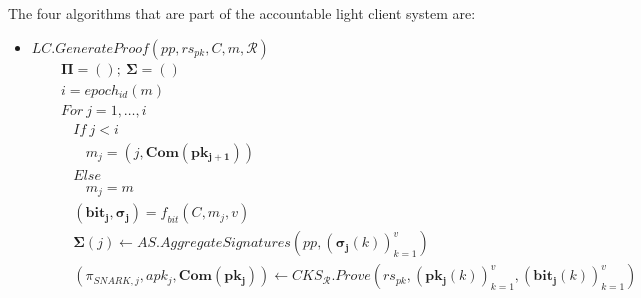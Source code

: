 \noindent The four algorithms that are part of the accountable light client system are: 
\begin{itemize}
\item $\mathit{LC.GenerateProof}(\mathit{pp}, \mathit{rs_{\mathit{pk}}}, C, m, \mathcal{R})$
\begin{align*}
&\ \ \ \ \mathbf{\Pi} = (); \ \mathbf{\Sigma} = () \\
&\ \ \ \ i = \mathit{epoch_{id}}(m) \\
&\ \ \ \ \mathit{For} \ j = 1, \ldots, i \\
&\ \ \ \ \ \ \ \ \mathit{If} \  j < i  \\
&\ \ \ \ \ \ \ \ \ \ \ \ \mathit{m_j}= (j,\mathbf{Com}(\mathbf{pk_{j+1}})) \\
&\ \ \ \ \ \ \ \ \mathit{Else} \\
&\ \ \ \ \ \ \ \ \ \ \ \ \mathit{m_j} = m  \\
&\ \ \ \ \ \ \ \ (\mathbf{bit_j}, \mathbf{\sigma_j}) = \mathit{f_{bit}}(C, m_j, v) \\
&\ \ \ \ \ \ \ \ \mathbf{\Sigma}(j) \leftarrow \mathit{AS.AggregateSignatures}(\mathit{pp}, (\mathbf{\sigma_j}(k))_{k=1}^v) \\ 
&\ \ \ \ \ \ \ \ (\mathit{\pi_{\mathit{SNARK},j}}, \mathit{apk_j}, \mathbf{Com}(\mathbf{pk_{j}})) \leftarrow \mathit{CKS_{\mathcal{R}}.Prove}(\mathit{rs}_{pk}, (\mathbf{pk_{j}}(k))_{k=1}^{v}, (\mathbf{bit_j}(k))_{k=1}^{v})\\

\end{align*}
\end{itemize}
